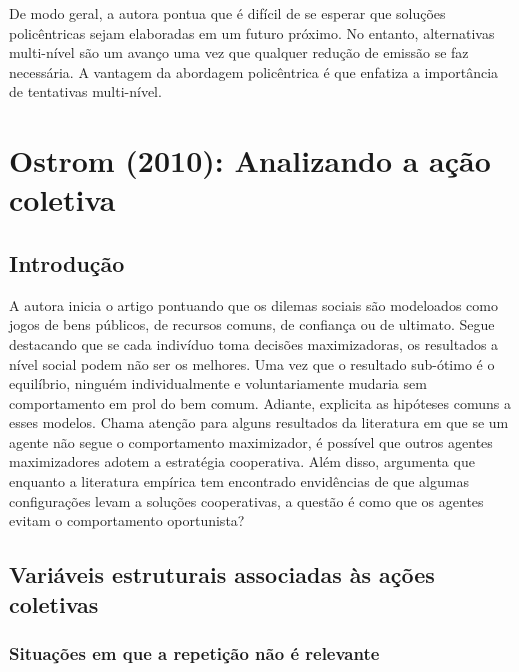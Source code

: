 \documentclass[11pt]{article}
\begin{document}
De modo geral, a autora pontua que é difícil de se esperar que soluções policêntricas sejam elaboradas em um futuro próximo.
No entanto, alternativas multi-nível são um avanço uma vez que qualquer redução de emissão se faz necessária.
A vantagem da abordagem policêntrica é que enfatiza a importância de tentativas multi-nível.

\section{Ostrom (2010): Analizando a ação coletiva}
\label{sec:org3f2273a}

\subsection{Introdução}
\label{sec:org11da158}

A autora inicia o artigo pontuando que os dilemas sociais são modeloados como jogos de bens públicos, de recursos comuns, de confiança ou de ultimato.
Segue destacando que se cada indivíduo toma decisões maximizadoras, os resultados a nível social podem não ser os melhores.
Uma vez que o resultado sub-ótimo é o equilíbrio, ninguém individualmente e voluntariamente mudaria sem comportamento em prol do bem comum.
Adiante, explicita as hipóteses comuns a esses modelos.
Chama atenção para alguns resultados da literatura em que se um agente não segue o comportamento maximizador, é possível que outros agentes maximizadores adotem a estratégia cooperativa.
Além disso, argumenta que enquanto a literatura empírica tem encontrado envidências de que algumas configurações levam a soluções cooperativas, a questão é como que os agentes evitam o comportamento oportunista?

\subsection{Variáveis estruturais associadas às ações coletivas}
\label{sec:org9a6e241}

\subsubsection{Situações em que a repetição não é relevante}
\label{sec:orgdee1f43}
\end{document}
